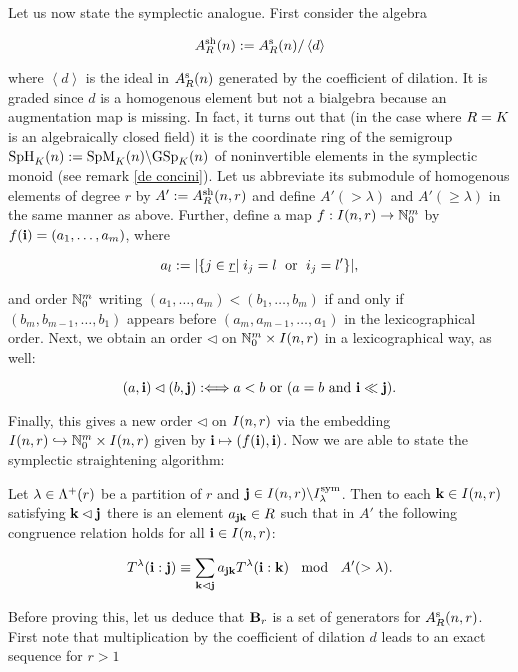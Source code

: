 \documentclass[twoside,12pt]{article}
\begin{document}
Let us now state the symplectic analogue. First consider the
algebra

\[ \shAn{\gr}:=\sAn{\gr}/\left<d \right> \]

where $\left< d\right>$ is the ideal in $\sAn{\gr}$ generated by the
coefficient of dilation. It is graded since $d$ is a homogenous element
but not a bialgebra because an augmentation map is missing. In fact, it turns
out that (in the case where $\gr = K$ is an algebraically closed field)
it is the coordinate ring of the semigroup
$\mmsp nK:=\gspm nK\ohne \gsp nK$ of 
noninvertible elements in the symplectic monoid (see remark \ref{de
  concini}). 
Let us abbreviate its submodule of homogenous elements of
degree $r$ by $A':=\rshAn{\gr} r$ and define $A'(>\lambda)$ and
$A'(\geq \lambda)$ in the same manner as above. Further, 
define a map $f:\nmind r\pfr \N_0^m$ by $f(\ibf i)=(a_1, \ldots ,
a_m)$, where 

\[ a_l:=|\{ j\in \mg r|\; i_j=l \;\mbox{ or } \; i_j=l' \}|, \]

and order $\N_0^m$ writing $(a_1,\ldots , a_m)<(b_1, \ldots , b_m)$ 
if and only if $(b_m, b_{m-1}, \ldots , b_1)$ appears before $(a_m,
a_{m-1}, \ldots , a_1)$ in the lexicographical order.  Next, we
obtain an order $\lhd$ on $\N_0^m\times \nmind r$ in a lexicographical way, as
well:

 \[(a, \ibf i)\lhd (b, \ibf j) :\gdw a < b \mbox{ or }
(a = b \mbox{ and } \ibf i \ll \ibf j).\]

Finally, this gives a new order $\lhd$ on $\nmind r$ via the embedding
$\nmind r\hookrightarrow \N_0^m\times \nmind r$ given by $\ibf
i\mapsto (f(\ibf i), \ibf i)$. Now we are able to state the symplectic
straightening algorithm:


\begin{prop} 
\label{Straightening Algorithmus 2}
Let $\lambda \in \rprt r$ be a partition of $r$
and $\ibf j \in \nmind r \ohne \symind{\lambda}$. Then to each 
$\ibf k\in \nmind r$ satisfying $\ibf k\lhd \ibf j$ there is an element
$a_{\ibf j\ibf k} \in \gr$ such that
in $A'$ the following congruence relation holds
 for all $\ibf i\in \nmind r$:


\[
\bidet{\lambda}{\ibf i}{\ibf j} 
\equiv \sum_{\ibf k\lhd \ibf j} a_{\ibf j\ibf k}
\bidet{\lambda}{\ibf i}{\ibf k} \; \; \mbox{ mod } \; \; A'(>\lambda) .
\]
\end{prop}


Before proving this, let us deduce that $\B_r$ is a set of
generators for $\rsAn{\gr} r$. First note that multiplication by 
the coefficient of dilation $d$ leads to an exact sequence for $r>1$
\end{document}
